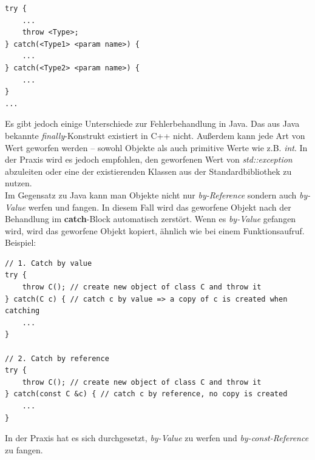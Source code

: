 \begin{lstlisting}
try {
	...
	throw <Type>;
} catch(<Type1> <param name>) {
	...
} catch(<Type2> <param name>) {
	...
}
...
\end{lstlisting} 

Es gibt jedoch einige Unterschiede zur Fehlerbehandlung in Java.
Das aus Java bekannte \emph{finally}-Konstrukt existiert in C++ nicht.
Außerdem kann jede Art von Wert geworfen werden -- sowohl Objekte als auch primitive Werte wie z.B. \emph{int}.
In der Praxis wird es jedoch empfohlen, den geworfenen Wert von \emph{std::exception} abzuleiten oder eine der existierenden Klassen aus der Standardbibliothek zu nutzen. \\

Im Gegensatz zu Java kann man Objekte nicht nur \emph{by-Reference} sondern auch \emph{by-Value} werfen und fangen. In diesem Fall wird das geworfene Objekt nach der Behandlung im \textbf{catch}-Block automatisch zerstört. Wenn es \emph{by-Value} gefangen wird, wird das geworfene Objekt kopiert, ähnlich wie bei einem Funktionsaufruf. Beispiel:

\begin{lstlisting}
// 1. Catch by value
try {
	throw C(); // create new object of class C and throw it 
} catch(C c) { // catch c by value => a copy of c is created when catching
	...
}

// 2. Catch by reference
try {
	throw C(); // create new object of class C and throw it 
} catch(const C &c) { // catch c by reference, no copy is created
	...
}
\end{lstlisting} 

In der Praxis hat es sich durchgesetzt, \emph{by-Value} zu werfen und \emph{by-const-Reference} zu fangen.

